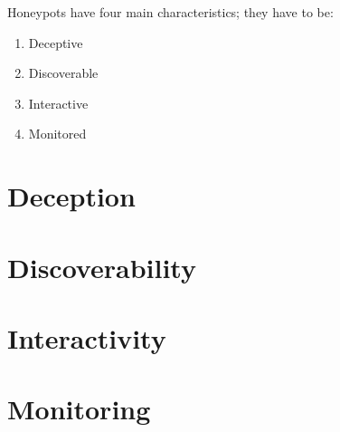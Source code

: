 \documentclass[epsfig,a4paper,11pt,titlepage,oneside,openany]{book}
\begin{document}
Honeypots have four main characteristics; they have to be:
\begin{enumerate}
\item Deceptive
\item Discoverable
\item Interactive
\item Monitored
\end{enumerate}

\section{Deception}
\section{Discoverability}
\section{Interactivity}
\section{Monitoring}

\endgroup


%


\end{document}
